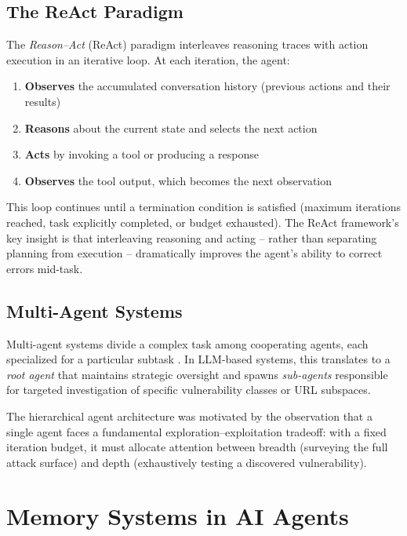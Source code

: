 \documentclass[12pt,a4paper,oneside,openany]{book}
\newcommand{\term}[1]{\textit{#1}}
\begin{document}
\subsection{The ReAct Paradigm}

The \term{Reason--Act} (ReAct) paradigm \cite{yao2022react} interleaves reasoning traces with action execution in an iterative loop. At each iteration, the agent:

\begin{enumerate}
\item \textbf{Observes} the accumulated conversation history (previous actions and their results)
\item \textbf{Reasons} about the current state and selects the next action
\item \textbf{Acts} by invoking a tool or producing a response
\item \textbf{Observes} the tool output, which becomes the next observation
\end{enumerate}

This loop continues until a termination condition is satisfied (maximum iterations reached, task explicitly completed, or budget exhausted). The ReAct framework's key insight is that interleaving reasoning and acting -- rather than separating planning from execution -- dramatically improves the agent's ability to correct errors mid-task.

\subsection{Multi-Agent Systems}

Multi-agent systems divide a complex task among cooperating agents, each specialized for a particular subtask \cite{wooldridge1995intelligent}. In LLM-based systems, this translates to a \term{root agent} that maintains strategic oversight and spawns \term{sub-agents} responsible for targeted investigation of specific vulnerability classes or URL subspaces.

The hierarchical agent architecture was motivated by the observation that a single agent faces a fundamental exploration--exploitation tradeoff: with a fixed iteration budget, it must allocate attention between breadth (surveying the full attack surface) and depth (exhaustively testing a discovered vulnerability).

\section{Memory Systems in AI Agents}
\end{document}
